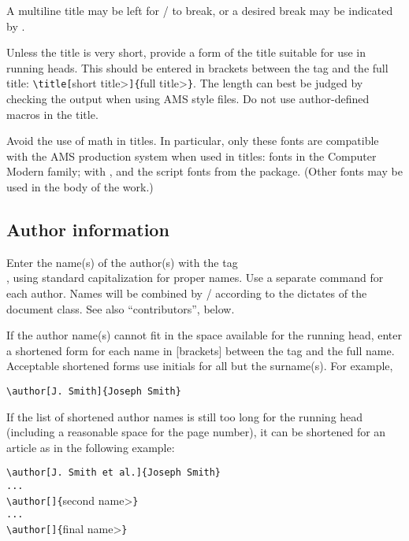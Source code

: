 A multiline title may be left for \latex/ to break, or a desired break
may be indicated by \cn{\\}.

\ifmonograph
\else\ifmemoirs
\else
Unless the title is very short, provide a form of the title suitable
for use in running heads.  This should be entered in brackets between the
tag  and the full title:
\verb+\title[+\<short title>\verb+]{+\<full title>\verb+}+.
The length can best be judged by checking the output when using AMS style
files.  Do not use author-defined macros in the title.
\fi\fi

Avoid the use of math in titles.  In particular, only these fonts are
compatible with the AMS production system when used in titles: fonts
in the Computer Modern family;  with , and
the script fonts from the  package.  (Other fonts may be
used in the body of the work.)


\subsection{Author information}\label{ss:authorinfo}
Enter the name(s) of the author(s) with the tag \\, using
standard capitalization for proper names.  Use a separate 
command for each author.  Names will be combined by \latex/ according
to the dictates of the document class.  See also ``contributors'',
below.

\ifmonograph
\else\ifmemoirs
\else
If the author name(s) cannot fit in the space available for the running
head, enter a shortened form for each name in [brackets]
between the tag  and the full name.  Acceptable shortened
forms use initials for all but the surname(s).  For example,
\begin{verbatim}
\author[J. Smith]{Joseph Smith}
\end{verbatim}
If the list of shortened author names is still too long for the running
head (including a reasonable space for the page number), it can be
shortened for an article as in the following example:
\begin{trivlist}
\item\relax
\verb+\author[J. Smith et al.]{Joseph Smith}+\\
\verb+...+\\
\verb+\author[]{+\<second name>\verb+}+\\
\verb+...+\\
\verb+\author[]{+\<final name>\verb+}+
\end{trivlist}


